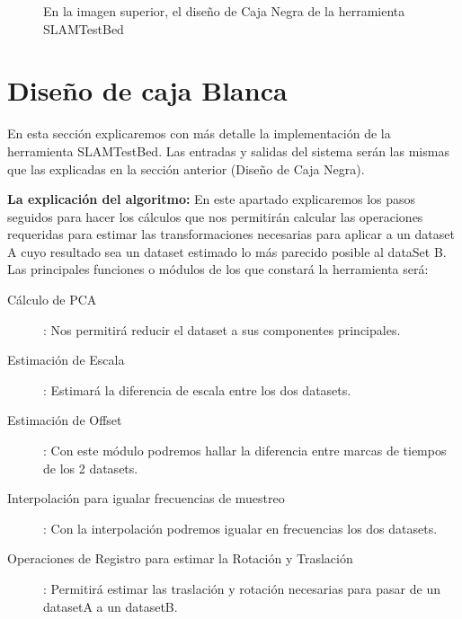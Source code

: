 \begin{figure}[H]
\begin{center}
\hspace{0.5cm}
\end{center}
\caption{ En la imagen superior, el diseño de Caja Negra de la herramienta SLAMTestBed }
\end{figure}

\section{Diseño de caja Blanca}
En esta sección explicaremos con más detalle la implementación de la herramienta SLAMTestBed.
Las entradas y salidas del sistema serán las mismas que las explicadas en la sección anterior (Diseño de Caja Negra).

\textbf{La explicación del algoritmo:}
En este apartado explicaremos los pasos seguidos para hacer los cálculos que nos permitirán calcular las operaciones requeridas para estimar las transformaciones necesarias para aplicar a un dataset A cuyo resultado sea un dataset estimado lo más parecido posible al dataSet B. 
Las principales funciones o módulos de los que constará la herramienta será:
\begin{description}
\item [Cálculo de PCA]: Nos permitirá reducir el dataset a sus componentes principales.
\item [Estimación de Escala]: Estimará la diferencia de escala entre los dos datasets.
\item [Estimación de Offset]: Con este módulo podremos hallar la diferencia entre marcas de tiempos de los 2 datasets.
\item [Interpolación para igualar frecuencias de muestreo]: Con la interpolación podremos igualar en frecuencias los dos datasets.
\item [Operaciones de Registro para estimar la Rotación y Traslación]: Permitirá estimar las traslación y rotación necesarias para pasar de un datasetA a un datasetB.
\end{description}


